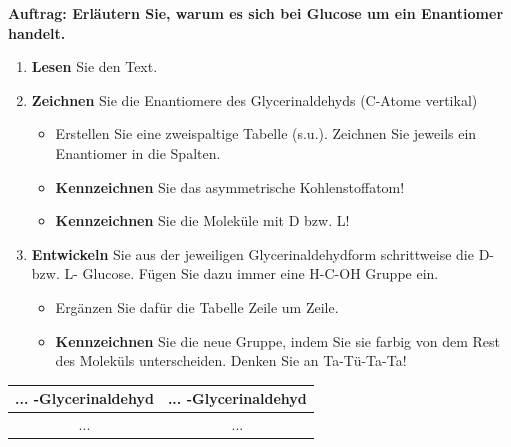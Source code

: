 \documentclass{scrartcl}  %
\begin{document}
			\noindent \textbf{Auftrag: Erläutern Sie, warum es sich bei Glucose um ein Enantiomer handelt.}
			\begin{enumerate}
				\item \textbf{Lesen} Sie den Text.
				\item \textbf{Zeichnen} Sie die Enantiomere des Glycerinaldehyds (C-Atome vertikal)
					\begin{itemize}
						\item Erstellen Sie eine zweispaltige Tabelle (s.u.). Zeichnen Sie jeweils ein Enantiomer in die Spalten.
						\item \textbf{Kennzeichnen} Sie das asymmetrische Kohlenstoffatom!
						\item \textbf{Kennzeichnen} Sie die Moleküle mit D bzw. L!
					\end{itemize}
				\item \textbf{Entwickeln} Sie aus der jeweiligen Glycerinaldehydform schrittweise die D- bzw. L- Glucose. Fügen Sie dazu immer eine H-C-OH Gruppe ein.
					\begin{itemize}
						\item Ergänzen Sie dafür die Tabelle Zeile um Zeile.
						\item \textbf{Kennzeichnen} Sie die neue Gruppe, indem Sie sie farbig von dem Rest des Moleküls unterscheiden. Denken Sie an Ta-Tü-Ta-Ta!
					\end{itemize} 
			\end{enumerate}
			
			\begin{center}
				\begin{tabular}{|c|c|}
					\hline
					... -Glycerinaldehyd & ... -Glycerinaldehyd \\
					\hline
					... & ... \\
					\hline
				\end{tabular}
			\end{center}
\end{document}
